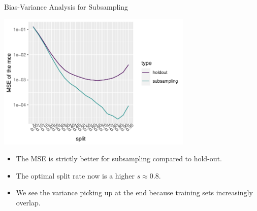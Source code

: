 \begin{vbframe}{Bias-Variance Analysis for Subsampling}
\begin{center}
\includegraphics[width=0.7\textwidth]{figure/eval-resampling-example-2}
\end{center}

\begin{itemize}
  \item The MSE is strictly better for subsampling compared to hold-out.
  \item The optimal split rate now is a higher $s \approx 0.8$.
  \item We see the variance picking up at the end because training sets 
  increasingly overlap.
\end{itemize}

\end{vbframe}



